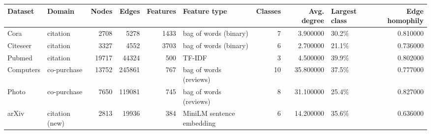 \begin{tabular}{llrrrlrrlr}
\toprule
Dataset & Domain & Nodes & Edges & Features & Feature type & Classes & Avg. degree & Largest class & Edge homophily \\
\midrule
Cora & citation & 2708 & 5278 & 1433 & bag of words (binary) & 7 & 3.900000 & 30.2\% & 0.810000 \\
Citeseer & citation & 3327 & 4552 & 3703 & bag of words (binary) & 6 & 2.700000 & 21.1\% & 0.736000 \\
Pubmed & citation & 19717 & 44324 & 500 & TF-IDF & 3 & 4.500000 & 39.9\% & 0.802000 \\
Computers & co-purchase & 13752 & 245861 & 767 & bag of words (reviews) & 10 & 35.800000 & 37.5\% & 0.777000 \\
Photo & co-purchase & 7650 & 119081 & 745 & bag of words (reviews) & 8 & 31.100000 & 25.4\% & 0.827000 \\
arXiv & citation (new) & 2813 & 19936 & 384 & MiniLM sentence embedding & 6 & 14.200000 & 35.6\% & 0.636000 \\
\bottomrule
\end{tabular}

